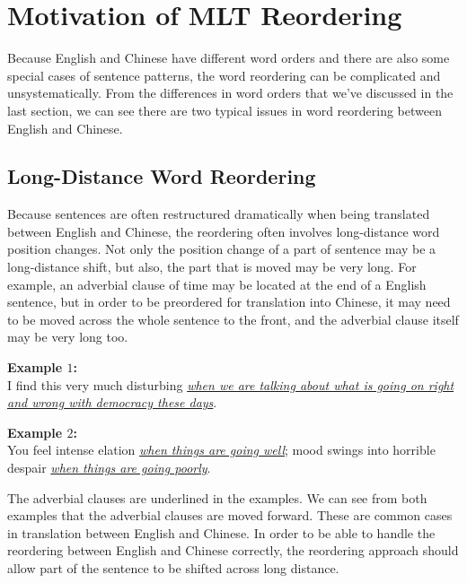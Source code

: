 \section{Motivation of \acf{MLT} Reordering}
\label{ch:ReorderingApproach:sec:Motivation}

Because English and Chinese have different word orders and there are also some special cases of sentence patterns, the word reordering can be complicated and unsystematically. From the differences in word orders that we've discussed in the last section, we can see there are two typical issues in word reordering between English and Chinese.

\subsection{Long-Distance Word Reordering}

Because sentences are often restructured dramatically when being translated between English and Chinese, the reordering often involves long-distance word position changes. Not only the position change of a part of sentence may be a long-distance shift, but also, the part that is moved may be very long. For example, an adverbial clause of time may be located at the end of a English sentence, but in order to be preordered for translation into Chinese, it may need to be moved across the whole sentence to the front, and the adverbial clause itself may be very long too. 

\textbf{Example $1$:}\\
I find this very much disturbing \emph{\ul{when we are talking about what is going on right and wrong with democracy these days}}.\smallskip\\

\textbf{Example $2$:}\\
You feel intense elation \emph{\ul{when things are going well}}; mood swings into horrible despair \emph{\ul{when things are going poorly}}.\smallskip\\

The adverbial clauses are underlined in the examples. We can see from both examples that the adverbial clauses are moved forward. These are common cases in translation between English and Chinese. In order to be able to handle the reordering between English and Chinese correctly, the reordering approach should allow part of the sentence to be shifted across long distance.

